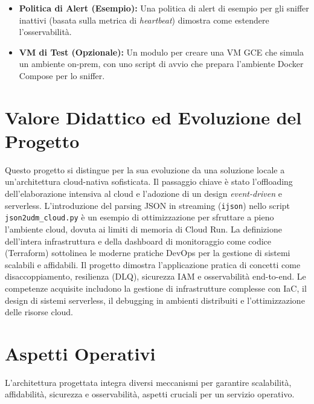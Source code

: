\documentclass[11pt, a4paper]{article}
\begin{document}
\begin{itemize}
    \item \textbf{Politica di Alert (Esempio):} Una politica di alert di esempio per gli sniffer inattivi (basata sulla metrica di \textit{heartbeat}) dimostra come estendere l'osservabilità.
    \item \textbf{VM di Test (Opzionale):} Un modulo per creare una VM GCE che simula un ambiente on-prem, con uno script di avvio che prepara l'ambiente Docker Compose per lo sniffer.
\end{itemize}

\section{Valore Didattico ed Evoluzione del Progetto}
\label{sec:valore_didattico}

Questo progetto si distingue per la sua evoluzione da una soluzione locale a un'architettura cloud-nativa sofisticata. Il passaggio chiave è stato l'offloading dell'elaborazione intensiva al cloud e l'adozione di un design \textit{event-driven} e serverless. L'introduzione del parsing JSON in streaming (\texttt{ijson}) nello script \texttt{json2udm\_cloud.py} è un esempio di ottimizzazione per sfruttare a pieno l'ambiente cloud, dovuta ai limiti di memoria di Cloud Run. La definizione dell'intera infrastruttura e della dashboard di monitoraggio come codice (Terraform) sottolinea le moderne pratiche DevOps per la gestione di sistemi scalabili e affidabili. Il progetto dimostra l'applicazione pratica di concetti come disaccoppiamento, resilienza (DLQ), sicurezza IAM e osservabilità end-to-end. Le competenze acquisite includono la gestione di infrastrutture complesse con IaC, il design di sistemi serverless, il debugging in ambienti distribuiti e l'ottimizzazione delle risorse cloud.

\section{Aspetti Operativi}
\label{sec:aspetti_operativi}
L'architettura progettata integra diversi meccanismi per garantire scalabilità, affidabilità, sicurezza e osservabilità, aspetti cruciali per un servizio operativo.
\end{document}
